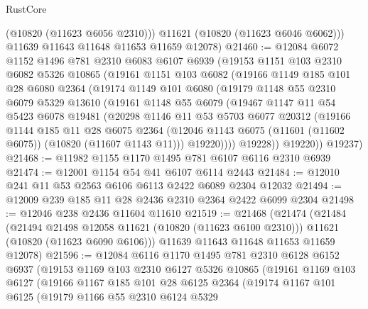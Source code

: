 \begin{lexlean}{RustCore}
\begin{coremodule}
          (@10820 (@11623 @6056 @2310)))
        @11621
        (@10820 (@11623 @6046 @6062)))
      @11639
      @11643
      @11648
      @11653
      @11659
      @12078)
@21460 := @12084
    @6072
    @1152
    @1496
    @781
    @2310
    @6083
    @6107
    @6939
    (@19153
      @1151
      @103
      @2310
      @6082
      @5326
      @10865
      (@19161
        @1151
        @103
        @6082
        (@19166
          @1149
          @185
          @101
          @28
          @6080
          @2364
          (@19174
            @1149
            @101
            @6080
            (@19179
              @1148
              @55
              @2310
              @6079
              @5329
              @13610
              (@19161
                @1148
                @55
                @6079
                (@19467
                  @1147
                  @11
                  @54
                  @5423
                  @6078
                  @19481
                  (@20298
                    @1146
                    @11
                    @53
                    @5703
                    @6077
                    @20312
                    (@19166
                      @1144
                      @185
                      @11
                      @28
                      @6075
                      @2364
                      (@12046 @1143 @6075 (@11601 (@11602 @6075)) (@10820 (@11607 @1143 @11)))
                      @19220))))
              @19228))
          @19220))
      @19237)
@21468 := @11982 @1155 @1170 @1495 @781 @6107 @6116 @2310 @6939
@21474 := @12001 @1154 @54 @41 @6107 @6114 @2443
@21484 := @12010 @241 @11 @53 @2563 @6106 @6113 @2422 @6089 @2304 @12032
@21494 := @12009 @239 @185 @11 @28 @2436 @2310 @2364 @2422 @6099 @2304
@21498 := @12046 @238 @2436 @11604 @11610
@21519 := @21468
    (@21474
      (@21484
        (@21494 @21498 @12058 @11621 (@10820 (@11623 @6100 @2310)))
        @11621
        (@10820 (@11623 @6090 @6106)))
      @11639
      @11643
      @11648
      @11653
      @11659
      @12078)
@21596 := @12084
    @6116
    @1170
    @1495
    @781
    @2310
    @6128
    @6152
    @6937
    (@19153
      @1169
      @103
      @2310
      @6127
      @5326
      @10865
      (@19161
        @1169
        @103
        @6127
        (@19166
          @1167
          @185
          @101
          @28
          @6125
          @2364
          (@19174
            @1167
            @101
            @6125
            (@19179
              @1166
              @55
              @2310
              @6124
              @5329

\end{coremodule}
\end{lexlean}
